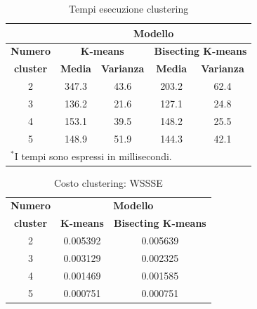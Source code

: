 \documentclass[conference]{IEEEtran}
\begin{document}
\begin{table}[htbp]
\caption{Tempi esecuzione clustering}
\begin{center}
\begin{tabular}{|c|c|c|c|c|}
\hline
\textbf{}&\multicolumn{4}{|c|}{\textbf{Modello}} \\ \hline
\textbf{Numero} & \multicolumn{2}{|c|}{\textbf{K-means}} & \multicolumn{2}{|c|}{\textbf{Bisecting K-means}} \\ \cline{2-5} 
\textbf{cluster} & \textbf{Media} & \textbf{Varianza} & \textbf{Media} & \textbf{Varianza} \\ \hline
2 & 347.3 & 43.6 & 203.2 & 62.4 \\ \hline
3 & 136.2 & 21.6 & 127.1 & 24.8 \\ \hline
4 & 153.1 & 39.5 & 148.2 & 25.5 \\ \hline
5 & 148.9 & 51.9 & 144.3 & 42.1 \\ \hline
\multicolumn{5}{l}{$^{\mathrm{*}}$I tempi sono espressi in millisecondi.}
\end{tabular}
\label{tab2}
\end{center}
\end{table}

\begin{table}[htbp]
\caption{Costo clustering: WSSSE}
\begin{center}
\begin{tabular}{|c|c|c|}
\hline
\textbf{Numero}&\multicolumn{2}{|c|}{\textbf{Modello}} \\ \cline{2-3}
\textbf{cluster} & \multicolumn{1}{|c|}{\textbf{K-means}} & \multicolumn{1}{|c|}{\textbf{Bisecting K-means}} \\ \hline
2 & 0.005392 & 0.005639 \\ \hline
3 & 0.003129 & 0.002325 \\ \hline
4 & 0.001469 & 0.001585 \\ \hline
5 & 0.000751 & 0.000751 \\ \hline
\end{tabular}
\label{tab3}
\end{center}
\end{table}
\end{document}
